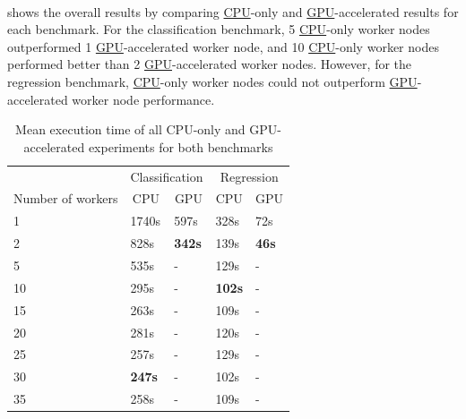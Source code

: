 \paragraph{}
 shows the overall results by comparing \hyperlink{abbr:cpu}{CPU}-only and \hyperlink{abbr:gpu}{GPU}-accelerated results for each benchmark.
For the classification benchmark, 5 \hyperlink{abbr:cpu}{CPU}-only worker nodes outperformed 1 \hyperlink{abbr:gpu}{GPU}-accelerated worker node, and 10 \hyperlink{abbr:cpu}{CPU}-only worker nodes performed better than 2 \hyperlink{abbr:gpu}{GPU}-accelerated worker nodes.
However, for the regression benchmark, \hyperlink{abbr:cpu}{CPU}-only worker nodes could not outperform \hyperlink{abbr:gpu}{GPU}-accelerated worker node performance.
\begin{table}[ht]
\centering
\begin{tabular}{@{}l|ll|ll@{}}
\toprule
                  & \multicolumn{2}{c|}{Classification}                & \multicolumn{2}{c}{Regression}                    \\
Number of workers & \multicolumn{1}{c}{CPU} & \multicolumn{1}{c|}{GPU} & \multicolumn{1}{c}{CPU} & \multicolumn{1}{c}{GPU} \\ \midrule
1  & 1740s         & 597s          & 328s          & 72s \\
2  & 828s          & \textbf{342s} & 139s          & \textbf{46s} \\
5  & 535s          & -             & 129s          & -     \\
10 & 295s          & -             & \textbf{102s} & -     \\
15 & 263s          & -             & 109s          & -     \\
20 & 281s          & -             & 120s          & -     \\
25 & 257s          & -             & 129s          & -     \\
30 & \textbf{247s} & -             & 102s          & -     \\
35 & 258s          & -             & 109s          & -     \\ \bottomrule
\end{tabular}
\caption{Mean execution time of all CPU-only and GPU-accelerated experiments for both benchmarks}
\label{table:07_gpu_overall_results}
\end{table}


